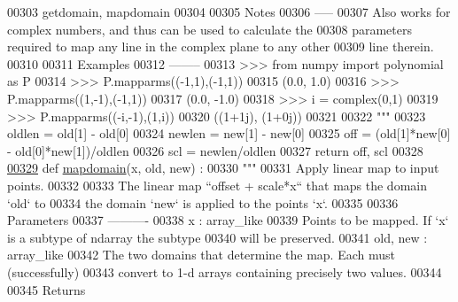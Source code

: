 \begin{DoxyCode}
00303 \textcolor{stringliteral}{    getdomain, mapdomain}
00304 \textcolor{stringliteral}{}
00305 \textcolor{stringliteral}{    Notes}
00306 \textcolor{stringliteral}{    -----}
00307 \textcolor{stringliteral}{    Also works for complex numbers, and thus can be used to calculate the}
00308 \textcolor{stringliteral}{    parameters required to map any line in the complex plane to any other}
00309 \textcolor{stringliteral}{    line therein.}
00310 \textcolor{stringliteral}{}
00311 \textcolor{stringliteral}{    Examples}
00312 \textcolor{stringliteral}{    --------}
00313 \textcolor{stringliteral}{    >>> from numpy import polynomial as P}
00314 \textcolor{stringliteral}{    >>> P.mapparms((-1,1),(-1,1))}
00315 \textcolor{stringliteral}{    (0.0, 1.0)}
00316 \textcolor{stringliteral}{    >>> P.mapparms((1,-1),(-1,1))}
00317 \textcolor{stringliteral}{    (0.0, -1.0)}
00318 \textcolor{stringliteral}{    >>> i = complex(0,1)}
00319 \textcolor{stringliteral}{    >>> P.mapparms((-i,-1),(1,i))}
00320 \textcolor{stringliteral}{    ((1+1j), (1+0j))}
00321 \textcolor{stringliteral}{}
00322 \textcolor{stringliteral}{    """}
00323     oldlen = old[1] - old[0]
00324     newlen = new[1] - new[0]
00325     off = (old[1]*new[0] - old[0]*new[1])/oldlen
00326     scl = newlen/oldlen
00327     \textcolor{keywordflow}{return} off, scl
00328 
\hypertarget{polyutils_8py_source_l00329}{}\hyperlink{namespacepyneb_1_1utils_1_1polyutils_a9a4c51bf58904c4c9ddc7d7525404481}{00329} \textcolor{keyword}{def }\hyperlink{namespacepyneb_1_1utils_1_1polyutils_a9a4c51bf58904c4c9ddc7d7525404481}{mapdomain}(x, old, new) :
00330     \textcolor{stringliteral}{"""}
00331 \textcolor{stringliteral}{    Apply linear map to input points.}
00332 \textcolor{stringliteral}{}
00333 \textcolor{stringliteral}{    The linear map ``offset + scale*x`` that maps the domain `old` to}
00334 \textcolor{stringliteral}{    the domain `new` is applied to the points `x`.}
00335 \textcolor{stringliteral}{}
00336 \textcolor{stringliteral}{    Parameters}
00337 \textcolor{stringliteral}{    ----------}
00338 \textcolor{stringliteral}{    x : array\_like}
00339 \textcolor{stringliteral}{        Points to be mapped. If `x` is a subtype of ndarray the subtype}
00340 \textcolor{stringliteral}{        will be preserved.}
00341 \textcolor{stringliteral}{    old, new : array\_like}
00342 \textcolor{stringliteral}{        The two domains that determine the map.  Each must (successfully)}
00343 \textcolor{stringliteral}{        convert to 1-d arrays containing precisely two values.}
00344 \textcolor{stringliteral}{}
00345 \textcolor{stringliteral}{    Returns}

\end{DoxyCode}
